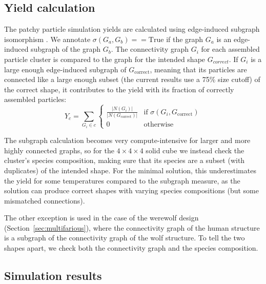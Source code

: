 \subsection{Yield calculation}

The patchy particle simulation yields are calculated using edge-induced subgraph isomorphism \cite{networkx}. 
We annotate \(\sigma(G_a,G_b) == \text{True}\) if the graph \(G_a\) is an edge-induced subgraph of the graph \(G_b\).
The connectivity graph \(G_i\) for each assembled particle cluster is compared to the graph for the intended shape \(G_{correct}\). If \(G_i\) is a large enough edge-induced subgraph of \(G_{\text{correct}}\), meaning that its particles are connected like a large enough subset (the current results use a 75\% size cutoff) of the correct shape, it contributes to the yield with its fraction of correctly assembled particles:
\begin{equation}
    Y_{c} = \sum_{G_i \in c} \begin{cases} 
           \frac{\left|N(G_i)\right|}{\left|N(G_{\text{correct}})\right|} & \text{if } \sigma(G_i,G_{\text{correct}}) \\
                          0 & \text{otherwise}
                        \end{cases}
\end{equation}

The subgraph calculation becomes very compute-intensive for larger and more highly connected graphs, so for the \(4 \times 4 \times 4\) solid cube we instead check the cluster's species composition, making sure that its species are a subset (with duplicates) of the intended shape. For the minimal solution, this underestimates the yield for some temperatures compared to the subgraph measure, as the solution can produce correct shapes with varying species compositions (but some mismatched connections). 

The other exception is used in the case of the werewolf design (Section~\ref{sec:multifarious}), where the connectivity graph of the human structure is a subgraph of the connectivity graph of the wolf structure. To tell the two shapes apart, we check both the connectivity graph and the species composition.


\subsection{Simulation results}

